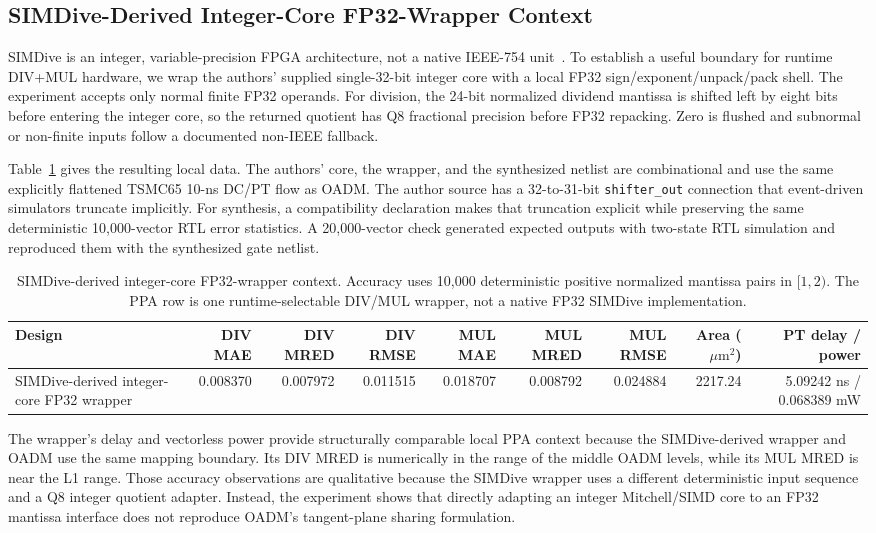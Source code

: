 \documentclass[conference]{IEEEtran}
\newcommand{\um}{\ensuremath{\mu\mathrm{m}^2}}
\begin{document}
\subsection{SIMDive-Derived Integer-Core FP32-Wrapper Context}
\label{sec:simdive-context}
SIMDive is an integer, variable-precision FPGA architecture, not a native
IEEE-754 unit~\cite{ebrahimi2020simdive}. To establish a useful boundary for
runtime DIV+MUL hardware, we wrap the authors' supplied single-32-bit integer
core with a local FP32 sign/exponent/unpack/pack shell. The experiment accepts
only normal finite FP32 operands. For division, the 24-bit normalized dividend
mantissa is shifted left by eight bits before entering the integer core, so the
returned quotient has Q8 fractional precision before FP32 repacking. Zero is
flushed and subnormal or non-finite inputs follow a documented non-IEEE
fallback.

Table~\ref{tab:simdive} gives the resulting local data. The authors' core,
the wrapper, and the synthesized netlist are combinational and use the same
explicitly flattened TSMC65 10-ns DC/PT flow as OADM. The author source has a 32-to-31-bit
\texttt{shifter\_out} connection that event-driven simulators truncate
implicitly. For synthesis, a compatibility declaration makes that truncation
explicit while preserving the same deterministic 10,000-vector RTL error
statistics. A 20,000-vector check generated expected outputs with two-state
RTL simulation and reproduced them with the synthesized gate netlist.

\begin{table}[t]
\caption{SIMDive-derived integer-core FP32-wrapper context. Accuracy uses
10,000 deterministic positive normalized mantissa pairs in $[1,2)$. The PPA
row is one runtime-selectable DIV/MUL wrapper, not a native FP32 SIMDive
implementation.}
\label{tab:simdive}
\centering\small
\begin{tabular}{lrrrrrrrr}
\toprule
Design & DIV MAE & DIV MRED & DIV RMSE & MUL MAE & MUL MRED & MUL RMSE & Area (\um) & PT delay / power \\
\midrule
SIMDive-derived integer-core FP32 wrapper & 0.008370 & 0.007972 & 0.011515 & 0.018707 & 0.008792 & 0.024884 & 2217.24 & 5.09242 ns / 0.068389 mW \\
\bottomrule
\end{tabular}
\end{table}

The wrapper's delay and vectorless power provide structurally comparable local
PPA context because the SIMDive-derived wrapper and OADM use the same mapping
boundary. Its DIV MRED is
numerically in the range of the middle OADM levels, while its MUL MRED is near
the L1 range. Those accuracy observations are qualitative because the SIMDive
wrapper uses a different deterministic input sequence and a Q8 integer quotient
adapter. Instead, the experiment shows that directly adapting an integer
Mitchell/SIMD core to an FP32 mantissa interface does not reproduce OADM's
tangent-plane sharing formulation.
\end{document}
